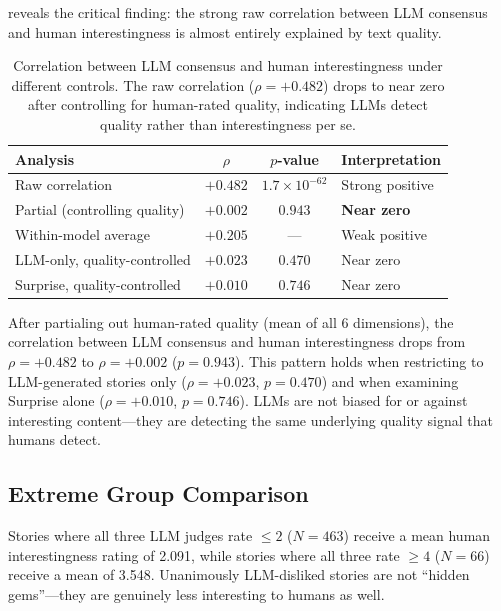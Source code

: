  reveals the critical finding: the strong raw correlation between LLM consensus and human interestingness is almost entirely explained by text quality.

\begin{table}[t]
    \centering
    \caption{Correlation between LLM consensus and human interestingness under different controls. The raw correlation ($\rho = +0.482$) drops to near zero after controlling for human-rated quality, indicating LLMs detect quality rather than interestingness per se.}
    \begin{tabular}{@{}lccl@{}}
        \toprule
        \textbf{Analysis} & \textbf{$\rho$} & \textbf{$p$-value} & \textbf{Interpretation} \\
        \midrule
        Raw correlation & $+0.482$ & $1.7 \times 10^{-62}$ & Strong positive \\
        Partial (controlling quality) & $+0.002$ & $0.943$ & \textbf{Near zero} \\
        Within-model average & $+0.205$ & --- & Weak positive \\
        LLM-only, quality-controlled & $+0.023$ & $0.470$ & Near zero \\
        Surprise, quality-controlled & $+0.010$ & $0.746$ & Near zero \\
        \bottomrule
    \end{tabular}
    \label{tab:quality}
\end{table}

After partialing out human-rated quality (mean of all 6 dimensions), the correlation between LLM consensus and human interestingness drops from $\rho = +0.482$ to $\rho = +0.002$ ($p = 0.943$).
This pattern holds when restricting to LLM-generated stories only ($\rho = +0.023$, $p = 0.470$) and when examining Surprise alone ($\rho = +0.010$, $p = 0.746$).
LLMs are not biased for or against interesting content---they are detecting the same underlying quality signal that humans detect.

\subsection{Extreme Group Comparison}
\label{sec:extreme}

Stories where all three LLM judges rate $\leq 2$ ($N = 463$) receive a mean human interestingness rating of 2.091, while stories where all three rate $\geq 4$ ($N = 66$) receive a mean of 3.548.
Unanimously LLM-disliked stories are not ``hidden gems''---they are genuinely less interesting to humans as well.

